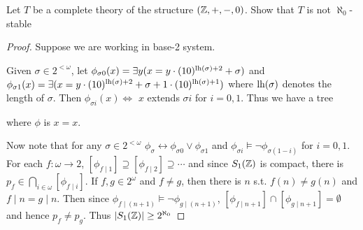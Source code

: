 \documentclass[11pt]{article}
\begin{document}
\begin{exercise}
Let \(T\) be a complete theory of the structure \((\mathbb{Z},+,-,0)\). Show that \(T\) is not \(\aleph_0\)-stable
\end{exercise}

\begin{proof}
Suppose we are working in base-2 system.

Given \(\sigma\in 2^{<\omega}\), let \(\phi_{\sigma 0}(x)=\exists y(x=y\cdot(10)^{\operatorname{lh}(\sigma)+2}+\sigma)\)
and \(\phi_{\sigma 1}(x)=\exists(x=y\cdot(10)^{\operatorname{lh}(\sigma)+2}+\sigma+1\cdot(10)^{\operatorname{lh}(\sigma)+1})\) where \(\operatorname{lh}(\sigma)\) denotes the length of
\(\sigma\). Then \(\phi_{\sigma i}(x)\Leftrightarrow\) \(x\) extends \(\sigma i\) for \(i=0,1\). Thus we have a tree
\begin{center}\end{center}
where \(\phi\) is \(x=x\).

Now note that for any \(\sigma\in 2^{<\omega}\) \(\phi_{\sigma}\leftrightarrow\phi_{\sigma 0}\vee\phi_{\sigma 1}\) and \(\phi_{\sigma i}\vDash\neg\phi_{\sigma(1-i)}\)
for \(i=0,1\). For each \(f:\omega\to 2\), \([\phi_{f\mid 1}]\supseteq[\phi_{f\mid 2}]\supseteq\cdots\) and since \(S_1(\mathbb{Z})\) is compact,
there is \(p_f\in\bigcap_{i\in\omega}[\phi_{f\mid i}]\). If \(f,g\in 2^\omega\) and \(f\neq g\), then there is \(n\)
s.t. \(f(n)\neq g(n)\) and \(f\mid n=g\mid n\). Then
since \(\phi_{f\mid(n+1)}\vDash\neg\phi_{g\mid (n+1)}\), \([\phi_{f\mid n+1}]\cap[\phi_{g\mid n+1}]=\emptyset\) and hence \(p_f\neq p_g\).
Thus \(\abs{S_1(\Z)}\ge 2^{\aleph_0}\)
\end{proof}
\end{document}
